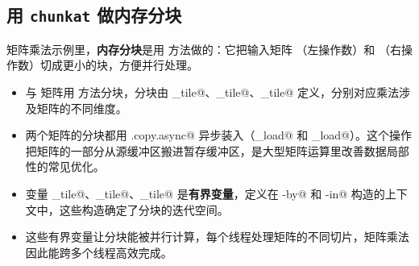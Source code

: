 \subsection*{用 \texttt{chunkat} 做内存分块}

矩阵乘法示例里，\textbf{内存分块}是用 \co@chunkat@ 方法做的：它把输入矩阵 \co@lhs@（左操作数）和 \co@rhs@（右操作数）切成更小的块，方便并行处理。

\begin{itemize}[leftmargin=1.6em]
\item \co@lhs@ 与 \co@rhs@ 矩阵用 \co@chunkat@ 方法分块，分块由 \co@m_tile@、\co@k_tile@、\co@n_tile@ 定义，分别对应乘法涉及矩阵的不同维度。
\item 两个矩阵的分块都用 \co@dma.copy.async@ 异步装入（\co@lhs_load@ 和 \co@rhs_load@）。这个操作把矩阵的一部分从源缓冲区搬进暂存缓冲区，是大型矩阵运算里改善数据局部性的常见优化。
\end{itemize}

\begin{itemize}[leftmargin=1.6em]
\item 变量 \co@m_tile@、\co@k_tile@、\co@n_tile@ 是\textbf{有界变量}，定义在 \co@parallel-by@ 和 \co@with-in@ 构造的上下文中，这些构造确定了分块的迭代空间。
\item 这些有界变量让分块能被并行计算，每个线程处理矩阵的不同切片，矩阵乘法因此能跨多个线程高效完成。
\end{itemize}
